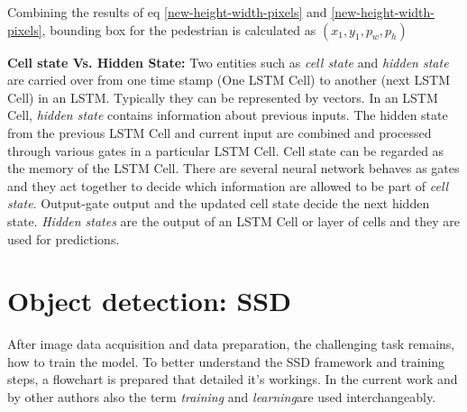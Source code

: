 Combining the results of eq \ref{new-height-width-pixels} and \ref{new-height-width-pixels}, bounding box for the pedestrian is calculated as $({x_1}, {y_1},{p_w}, {p_h})$


\textbf{Cell state Vs. Hidden State:}
Two entities such as \textit{cell state} and \textit{hidden state} are carried over from one time stamp (One LSTM Cell) to another (next LSTM Cell) in an LSTM. Typically they can be represented by vectors. In an LSTM Cell, \textit{hidden state }contains information about previous inputs. The hidden state from the previous LSTM Cell and current input are combined and processed through various gates in a particular LSTM Cell. Cell state can be regarded as the memory of the LSTM Cell. There are several neural network behaves as gates and they act together to decide which information are allowed to be part of \textit{cell state}. Output-gate output and the updated cell state decide the next hidden state. \textit{Hidden states} are the output of an LSTM Cell or layer of cells and they are used for predictions.  

\section{Object detection: SSD}
After image data acquisition and data preparation, the challenging task remains, how to train the model. 
To better understand the SSD framework and training steps, a flowchart is prepared that detailed it's workings. In the current work and by other authors also the term \textit{training }and \textit{learning}are used interchangeably. 

